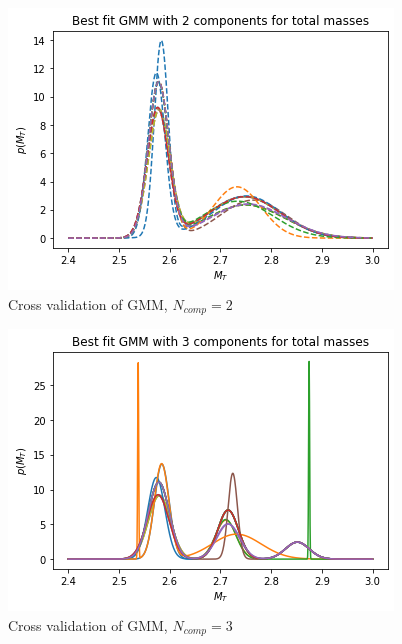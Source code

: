 \documentclass[journal,12pt,twocolumn]{IEEEtran}
\begin{document}
\begin{figure}[ht!]
\centering
\includegraphics[scale=0.6]{fig/cv_gmm2.png}
\caption{Cross validation of GMM, $N_{comp}=2$}
\end{figure}
\begin{figure}[ht!]
\centering
\includegraphics[scale=0.6]{fig/cv_gmm3.png}
\caption{Cross validation of GMM, $N_{comp}=3$}
\end{figure}
\end{document}
